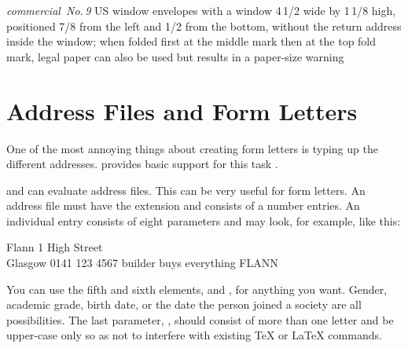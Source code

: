 \begin{desclist}
{    \emph{commercial~No.\,9} US window envelopes with a window 4\,1/2
    wide by 1\,1/8 high, positioned 7/8 from the left and
    1/2 from the bottom, without the return address inside the
    window; when folded first at the middle mark then at the top fold mark,
    legal paper can also be used but results in a paper-size warning}%
\end{desclist}
%
\EndIndexGroup
%
\EndIndexGroup


\section{Address Files and Form Letters}
%
\BeginIndexGroup
{}%
%
%
%

One of the most annoying things about creating form letters is typing up
the different addresses. \KOMAScript{} provides basic support for this task%
\iffalse%
, as did its predecessor \Class{scrlettr}%
\fi%
.%
\iffalse%
\ Currently there are plans for greatly enhanced support.%
\fi

\begin{Declaration}
\end{Declaration}%
 and  can evaluate address files.
This can be very useful for form letters. An address file must have the
extension  and consists of a number  entries.
An individual entry consists of eight parameters and may look, for example,
like this:
\begin{lstcode}
           {Flann}
           {1 High Street\\ Glasgow}
           {0141 123 4567}
           {builder}
           {}
           {buys everything}
           {FLANN}
\end{lstcode}
You can use the fifth and sixth elements,  and , for
anything you want. Gender, academic grade, birth date, or the date the person
joined a society are all possibilities. The last parameter, ,
should consist of more than one letter and be upper-case only so as not to
interfere with existing \TeX{} or \LaTeX{} commands.

